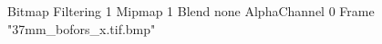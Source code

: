 {Bitmap
	{Filtering 1}
	{Mipmap 1}
	{Blend none}
	{AlphaChannel 0}
	{Frame "37mm_bofors_x.tif.bmp"}
}
